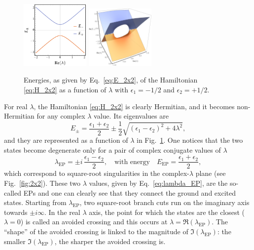 \documentclass[11pt,a4paper]{article}
\begin{document}
\begin{figure}[h!]
    \centering
    \includegraphics[width=0.3\textwidth]{2x2.pdf}
    \hspace{0.2\textwidth}
    \includegraphics[width=0.3\textwidth]{i2x2.pdf}
    \caption{Energies, as given by Eq.~\ref{eq:E_2x2}, of the Hamiltonian \eqref{eq:H_2x2} as a function of $\lambda$ with $\epsilon_1 = -1/2$ and $\epsilon_2 = +1/2$.}
    \label{fig:2x2}
\end{figure}

For real $\lambda$, the Hamiltonian \eqref{eq:H_2x2} is clearly Hermitian, and it becomes non-Hermitian for any complex $\lambda$ value.
Its eigenvalues are
\begin{equation}
\label{eq:E_2x2}
	E_{\pm} = \frac{\epsilon_1 + \epsilon_2}{2} \pm \frac{1}{2} \sqrt{(\epsilon_1 - \epsilon_2)^2 + 4\lambda^2},
\end{equation}
and they are represented as a function of $\lambda$ in Fig.~\ref{fig:2x2}.
One notices that the two states become degenerate only for a pair of complex conjugate values of $\lambda$
\begin{equation}
\label{eq:lambda_EP}
	\lambda_\text{EP} = \pm i\,\frac{\epsilon_1 - \epsilon_2}{2},
	\quad
	\text{with energy}	
	\quad
	E_\text{EP} = \frac{\epsilon_1 + \epsilon_2}{2},
\end{equation}
which correspond to square-root singularities in the complex-$\lambda$ plane (see Fig.~\eqref{fig:2x2}).
These two $\lambda$ values, given by Eq.~\eqref{eq:lambda_EP}, are the so-called EPs and one can clearly see that they connect the ground and excited states.
Starting from $\lambda_\text{EP}$, two square-root branch cuts run on the imaginary axis towards $\pm i \infty$.
In the real $\lambda$ axis, the point for which the states are the closest ($\lambda = 0$) is called an avoided crossing and this occurs at $\lambda = \Re(\lambda_\text{EP})$.
The ``shape'' of the avoided crossing is linked to the magnitude of $\Im(\lambda_\text{EP})$: the smaller $\Im(\lambda_\text{EP})$, the sharper the avoided crossing is.
\end{document}
